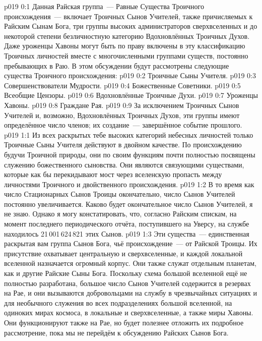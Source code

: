 \author{Божественный Советник}
\vs p019 0:1 Данная Райская группа~--- Равные Существа Троичного происхождения~--- включает Троичных Сынов Учителей, также причисляемых к Райским Сынам Бога, три группы высоких администраторов сверхвселенных и до некоторой степени безличностную категорию Вдохновлённых Троичных Духов. Даже уроженцы Хавоны могут быть по праву включены в эту классификацию Троичных личностей вместе с многочисленными группами существ, постоянно пребывающих в Раю. В этом обсуждении будут рассмотрены следующие существа Троичного происхождения:
\vs p019 0:2 Троичные Сыны Учителя.
\vs p019 0:3 Совершенствователи Мудрости.
\vs p019 0:4 Божественные Советники.
\vs p019 0:5 Всеобщие Цензоры.
\vs p019 0:6 Вдохновлённые Троичные Духи.
\vs p019 0:7 Уроженцы Хавоны.
\vs p019 0:8 Граждане Рая.
\vs p019 0:9 \pc За исключением Троичных Сынов Учителей и, возможно, Вдохновлённых Троичных Духов, эти группы имеют определённое число членов; их создание~--- завершённое событие прошлого.
\vs p019 1:1 Из всех раскрытых тебе высоких категорий небесных личностей только Троичные Сыны Учителя действуют в двойном качестве. По происхождению будучи Троичной природы, они по своим функциям почти полностью посвящены служению божественного сыновства. Они являются связующими существами, которые как бы перекидывают мост через вселенскую пропасть между личностями Троичного и двойственного происхождения.
\vs p019 1:2 В то время как число Стационарных Сынов Троицы окончательно, число Сынов Учителей постоянно увеличивается. Каково будет окончательное число Сынов Учителей, я не знаю. Однако я могу констатировать, что, согласно Райским спискам, на момент последнего периодического отчёта, поступившего на Уверсу, на службе находилось 21\,001\,624\,821 этих Сынов.
\vs p019 1:3 Эти существа~--- единственная раскрытая вам группа Сынов Бога, чьё происхождение~--- от Райской Троицы. Их присутствие охватывает центральную и сверхвселенные, и каждой локальной вселенной назначается огромный корпус. Они также служат отдельным планетам, как и другие Райские Сыны Бога. Поскольку схема большой вселенной ещё не полностью разработана, большое число Сынов Учителей содержится в резервах на Рае, и они вызываются добровольцами на службу в чрезвычайных ситуациях и для необычного служения во всех подразделениях большой вселенной, на одиноких мирах космоса, в локальные и сверхвселенные, а также миры Хавоны. Они функционируют также на Рае, но будет полезнее отложить их подробное рассмотрение, пока мы не перейдём к обсуждению Райских Сынов Бога.
